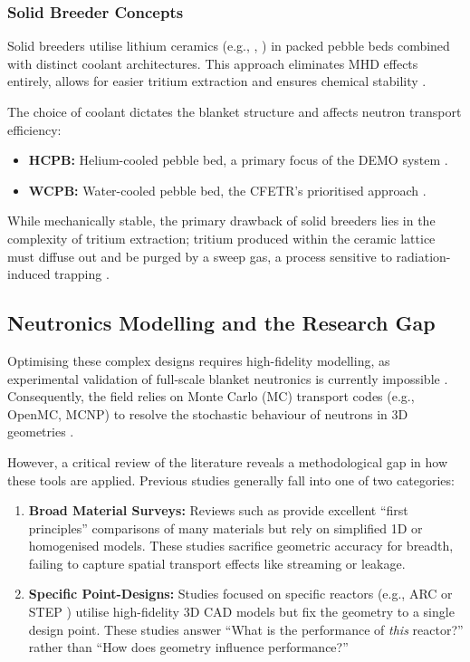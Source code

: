\documentclass[12pt]{article}
\begin{document}
\subsubsection{Solid Breeder Concepts}
Solid breeders utilise lithium ceramics (e.g., , ) in packed pebble beds
combined with distinct coolant architectures. This approach eliminates MHD effects entirely, allows
for easier tritium extraction and ensures chemical stability \cite{proust_solid_1991,
knitter_recent_2013}.

The choice of coolant dictates the blanket structure and affects neutron transport efficiency:
\begin{itemize}
    \item \textbf{HCPB:} Helium-cooled pebble bed, a primary focus of the DEMO system
    \cite{wang_current_2019,chaudhuri_overview_2013}.
    \item \textbf{WCPB:} Water-cooled pebble bed, the CFETR's prioritised approach
    \cite{lei_design_2020,liu_design_2022}.
\end{itemize}

While mechanically stable, the primary drawback of solid breeders lies in the complexity of tritium
extraction; tritium produced within the ceramic lattice must diffuse out and be purged by a sweep
gas, a process sensitive to radiation-induced trapping \cite{shi_density_2015}.

\subsection{Neutronics Modelling and the Research Gap}
\label{sec:research_gap}

Optimising these complex designs requires high-fidelity modelling, as experimental validation of
full-scale blanket neutronics is currently impossible \cite{delaporte-mathurin_advancing_2025}.
Consequently, the field relies on Monte Carlo (MC) transport codes (e.g., OpenMC, MCNP) to resolve
the stochastic behaviour of neutrons in 3D geometries \cite{romano_openmc_2015, bae_arc_2022}.

However, a critical review of the literature reveals a methodological gap in how these tools are
applied. Previous studies generally fall into one of two categories:
\begin{enumerate}
    \item \textbf{Broad Material Surveys:} Reviews such as \cite{hernandez_first_2018} provide
    excellent ``first principles'' comparisons of many materials but rely on simplified 1D or
    homogenised models. These studies sacrifice geometric accuracy for breadth, failing to capture
    spatial transport effects like streaming or leakage.
    \item \textbf{Specific Point-Designs:} Studies focused on specific reactors (e.g., ARC
    \cite{segantin_neutronic_2020} or STEP \cite{fradera_pre-conceptual_2021}) utilise high-fidelity
    3D CAD models but fix the geometry to a single design point. These studies answer ``What is the
    performance of \textit{this} reactor?'' rather than ``How does geometry influence performance?''
\end{enumerate}
\end{document}
